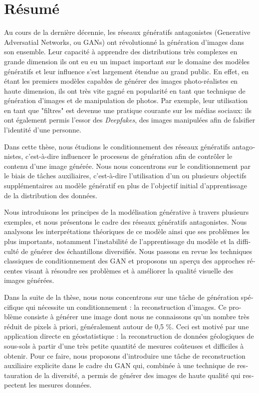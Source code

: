 \chapter*{Résumé}
\label{chap:resume}

\begin{otherlanguage}{french}
Au cours de la dernière décennie, les réseaux génératifs antagonistes (Generative Adversatial Networks, ou \ac{GAN}s) ont révolutionné la génération d'images dans son ensemble. Leur capacité à apprendre des distributions très complexes en grande dimension ils ont eu eu un impact important sur le domaine des modèles génératifs et leur influence s'est largement étendue au grand public. En effet, en étant les premiers modèles capables de générer des images photo-réalistes en haute dimension, ils ont très vite gagné en popularité en tant que technique de génération d'images et de manipulation de photos. Par exemple, leur utilisation en tant que "filtres" est devenue une pratique courante sur les médias sociaux: ils ont également permis l'essor des \textit{Deepfakes}, des images manipulées afin de falsifier l'identité d'une personne. 

Dans cette thèse, nous étudions le conditionnement des réseaux génératifs antagonistes, c'est-à-dire influencer le processus de génération afin de contrôler le contenu d'une image générée. Nous nous concentrons sur le conditionnement par le biais de tâches auxiliaires, c'est-à-dire l'utilisation d'un ou plusieurs objectifs supplémentaires au modèle génératif en plus de l'objectif initial d'apprentissage de la distribution des données.

Nous introduisons les principes de la modélisation générative à travers plusieurs exemples, et nous présentons le cadre des réseaux génératifs antagonistes. Nous analysons les interprétations théoriques de ce modèle ainsi que ses problèmes les plus importants, notamment l'instabilité de l'apprentissage du modèle et la difficulté de générer des échantillons diversifiés. Nous passons en revue les techniques classiques de conditionnement des GAN et proposons un aperçu des approches récentes visant à résoudre ses problèmes et à améliorer la qualité visuelle des images générées.

Dans la suite de la thèse, nous nous concentrons sur une tâche de génération spécifique qui nécessite un conditionnement : la reconstruction d'images. Ce problème consiste à générer une image dont nous ne connaissons qu'un nombre très réduit de pixels à priori, généralement autour de 0,5 \%. Ceci est motivé par une application directe en géostatistique : la reconstruction de données géologiques de sous-sols à partir d'une très petite quantité de mesures coûteuses et difficiles à obtenir. Pour ce faire, nous proposons d'introduire une tâche de reconstruction auxiliaire explicite dans le cadre du GAN qui, combinée à une technique de restauration de la diversité, a permis de générer des images de haute qualité qui respectent les mesures données.


\end{otherlanguage}
